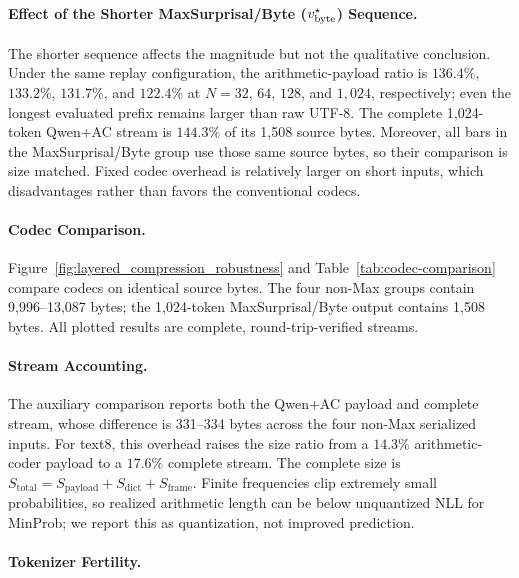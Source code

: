 \paragraph{Effect of the Shorter MaxSurprisal/Byte ($v^\star_{\mathrm{byte}}$) Sequence.}
\label{app:maxsurprisal-length}
The shorter sequence affects the magnitude but not the qualitative conclusion.
Under the same replay configuration, the arithmetic-payload ratio is $136.4\%$,
$133.2\%$, $131.7\%$, and $122.4\%$ at $N=32$, $64$, $128$, and $1{,}024$,
respectively; even the longest evaluated prefix remains larger than raw UTF-8.
The complete 1,024-token Qwen+AC stream is $144.3\%$ of its 1,508 source bytes.
Moreover, all bars in the MaxSurprisal/Byte group use those same source bytes,
so their comparison is size matched. Fixed codec overhead is relatively larger
on short inputs, which disadvantages rather than favors the conventional codecs.

\paragraph{Codec Comparison.}
Figure~\ref{fig:layered_compression_robustness} and
Table~\ref{tab:codec-comparison} compare codecs on identical source bytes. The
four non-Max groups contain 9,996--13,087 bytes; the 1,024-token
MaxSurprisal/Byte output contains 1,508 bytes. All plotted results are complete, round-trip-verified streams.

\paragraph{Stream Accounting.}
\label{app:stream-accounting}
The auxiliary comparison reports both the Qwen+AC payload and complete stream,
whose difference is 331--334 bytes across the four non-Max serialized inputs.
For text8, this overhead raises the size ratio from a $14.3\%$ arithmetic-coder
payload to a $17.6\%$ complete stream. The
complete size is $S_{\mathrm{total}}=S_{\mathrm{payload}}+S_{\mathrm{dict}}+
S_{\mathrm{frame}}$. Finite frequencies clip extremely small probabilities, so
realized arithmetic length can be below unquantized NLL for MinProb; we report
this as quantization, not improved prediction.



\paragraph{Tokenizer Fertility.}

